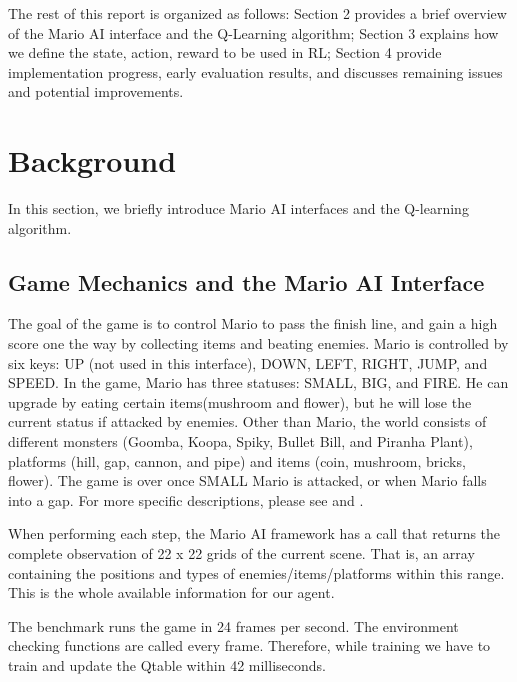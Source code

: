 The rest of this report is organized as follows: Section 2 provides a brief overview of the Mario AI interface and the Q-Learning algorithm; Section 3 explains how we define the state, action, reward to be used in RL; Section 4 provide implementation progress, early evaluation results, and discusses remaining issues and potential improvements.

\section{Background}
In this section, we briefly introduce Mario AI interfaces and the Q-learning algorithm.

\subsection{Game Mechanics and the Mario AI Interface}
The goal of the game is to control Mario to pass the finish line, and gain a high score one the way by collecting items and beating enemies. Mario is controlled by six keys: UP (not used in this interface), DOWN, LEFT, RIGHT, JUMP, and SPEED. In the game, Mario has three statuses: SMALL, BIG, and FIRE. He can upgrade by eating certain items(mushroom and flower), but he will lose the current status if attacked by enemies. Other than Mario, the world consists of different monsters (Goomba, Koopa, Spiky, Bullet Bill, and Piranha Plant), platforms (hill, gap, cannon, and pipe) and items (coin, mushroom, bricks, flower). The game is over once SMALL Mario is attacked, or when Mario falls into a gap. For more specific descriptions, please see \cite{tsay2011evolving} and \cite{togelius20102009}.

When performing each step, the Mario AI framework has a call that returns the complete observation of 22 x 22 grids of the current scene. That is, an array containing the positions and types of enemies/items/platforms within this range. This is the whole available information for our agent.

The benchmark runs the game in 24 frames per second. The environment checking functions are called every frame. Therefore, while training we have to train and update the Qtable within 42 milliseconds.

